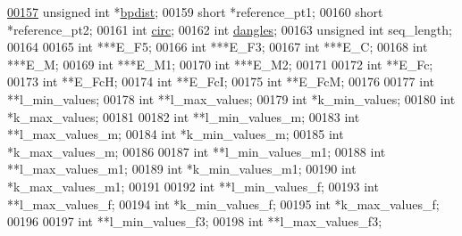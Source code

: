 \begin{DoxyCode}
\hypertarget{2Dfold_8h_source.tex_l00157}{}\hyperlink{group__kl__neighborhood__mfe_af1106e1a592e2dccc92b3452340549e0}{00157}   \textcolor{keywordtype}{unsigned} \textcolor{keywordtype}{int}    *\hyperlink{group__kl__neighborhood__mfe_af1106e1a592e2dccc92b3452340549e0}{bpdist};        
00159   \textcolor{keywordtype}{short}           *reference\_pt1;
00160   \textcolor{keywordtype}{short}           *reference\_pt2;
00161   \textcolor{keywordtype}{int}             \hyperlink{group__model__details_gaf9202a1a09f5828dc731e2d9a10fa111}{circ};
00162   \textcolor{keywordtype}{int}             \hyperlink{group__model__details_ga72b511ed1201f7e23ec437e468790d74}{dangles};
00163   \textcolor{keywordtype}{unsigned} \textcolor{keywordtype}{int}    seq\_length;
00164 
00165   \textcolor{keywordtype}{int}             ***E\_F5;
00166   \textcolor{keywordtype}{int}             ***E\_F3;
00167   \textcolor{keywordtype}{int}             ***E\_C;
00168   \textcolor{keywordtype}{int}             ***E\_M;
00169   \textcolor{keywordtype}{int}             ***E\_M1;
00170   \textcolor{keywordtype}{int}             ***E\_M2;
00171 
00172   \textcolor{keywordtype}{int}             **E\_Fc;
00173   \textcolor{keywordtype}{int}             **E\_FcH;
00174   \textcolor{keywordtype}{int}             **E\_FcI;
00175   \textcolor{keywordtype}{int}             **E\_FcM;
00176 
00177   \textcolor{keywordtype}{int}             **l\_min\_values;
00178   \textcolor{keywordtype}{int}             **l\_max\_values;
00179   \textcolor{keywordtype}{int}             *k\_min\_values;
00180   \textcolor{keywordtype}{int}             *k\_max\_values;
00181 
00182   \textcolor{keywordtype}{int}             **l\_min\_values\_m;
00183   \textcolor{keywordtype}{int}             **l\_max\_values\_m;
00184   \textcolor{keywordtype}{int}             *k\_min\_values\_m;
00185   \textcolor{keywordtype}{int}             *k\_max\_values\_m;
00186 
00187   \textcolor{keywordtype}{int}             **l\_min\_values\_m1;
00188   \textcolor{keywordtype}{int}             **l\_max\_values\_m1;
00189   \textcolor{keywordtype}{int}             *k\_min\_values\_m1;
00190   \textcolor{keywordtype}{int}             *k\_max\_values\_m1;
00191 
00192   \textcolor{keywordtype}{int}             **l\_min\_values\_f;
00193   \textcolor{keywordtype}{int}             **l\_max\_values\_f;
00194   \textcolor{keywordtype}{int}             *k\_min\_values\_f;
00195   \textcolor{keywordtype}{int}             *k\_max\_values\_f;
00196 
00197   \textcolor{keywordtype}{int}             **l\_min\_values\_f3;
00198   \textcolor{keywordtype}{int}             **l\_max\_values\_f3;

\end{DoxyCode}
